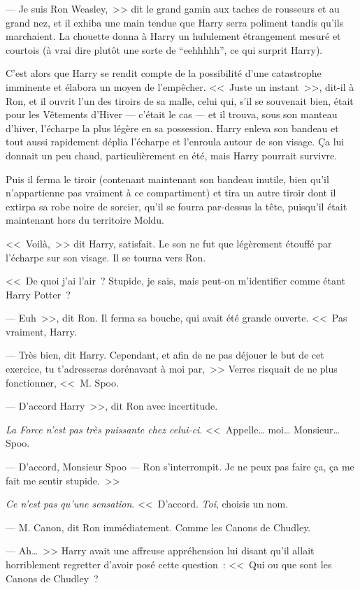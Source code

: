 --- Je suis Ron Weasley,~>> dit le grand gamin aux taches de rousseurs et au grand nez, et il exhiba une main tendue que Harry serra poliment tandis qu'ils marchaient. La chouette donna à Harry un hululement étrangement mesuré et courtois (à vrai dire plutôt une sorte de “eehhhhh”, ce qui surprit Harry).

C'est alors que Harry se rendit compte de la possibilité d'une catastrophe imminente et élabora un moyen de l'empêcher. <<~Juste un instant~>>, dit-il à Ron, et il ouvrit l'un des tiroirs de sa malle, celui qui, s'il se souvenait bien, était pour les Vêtements d'Hiver — c'était le cas — et il trouva, sous son manteau d'hiver, l'écharpe la plus légère en sa possession. Harry enleva son bandeau et tout aussi rapidement déplia l'écharpe et l'enroula autour de son visage. Ça lui donnait un peu chaud, particulièrement en été, mais Harry pourrait survivre.

Puis il ferma le tiroir (contenant maintenant son bandeau inutile, bien qu'il n'appartienne pas vraiment à ce compartiment) et tira un autre tiroir dont il extirpa sa robe noire de sorcier, qu'il se fourra par-dessus la tête, puisqu'il était maintenant hors du territoire Moldu.

<<~Voilà,~>> dit Harry, satisfait. Le son ne fut que légèrement étouffé par l'écharpe sur son visage. Il se tourna vers Ron.

<<~De quoi j'ai l'air~? Stupide, je sais, mais peut-on m'identifier comme étant Harry Potter~?

--- Euh~>>, dit Ron. Il ferma sa bouche, qui avait été grande ouverte. <<~Pas vraiment, Harry.

--- Très bien, dit Harry. Cependant, et afin de ne pas déjouer le but de cet exercice, tu t'adresseras dorénavant à moi par,~>> Verres risquait de ne plus fonctionner, <<~M. Spoo.

--- D'accord Harry~>>, dit Ron avec incertitude.

\emph{La Force n'est pas très puissante chez celui-ci}. <<~Appelle… moi… Monsieur… Spoo.

--- D'accord, Monsieur Spoo — Ron s'interrompit. Je ne peux pas faire ça, ça me fait me sentir stupide.~>>

\emph{Ce n'est pas qu'une sensation}. <<~D'accord. \emph{Toi}, choisis un nom.

--- M. Canon, dit Ron immédiatement. Comme les Canons de Chudley.

--- Ah…~>> Harry avait une affreuse appréhension lui disant qu'il allait horriblement regretter d'avoir posé cette question~: <<~Qui ou que sont les Canons de Chudley~?

